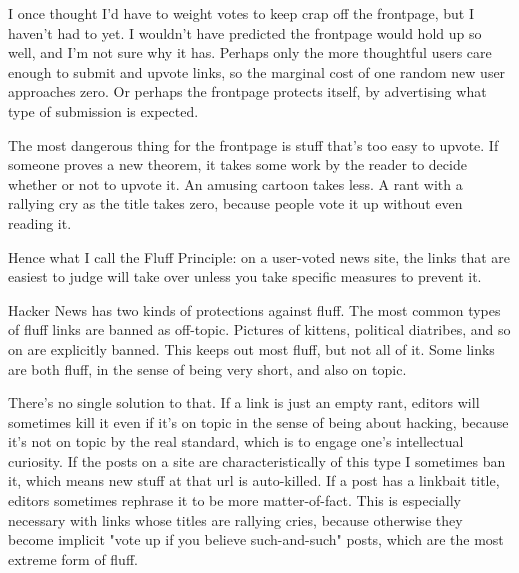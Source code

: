 I once thought I'd have
                  to weight votes to keep crap off the frontpage, but I haven't
                  had to yet. I wouldn't have predicted the frontpage would hold
                  up so well, and I'm not sure why it has. Perhaps only the more
                  thoughtful users care enough to submit and upvote links, so
                  the marginal cost of one random new user approaches zero. Or
                  perhaps the frontpage protects itself, by advertising what
                  type of submission is expected.

The most dangerous
                  thing for the frontpage is stuff that's too easy to upvote. If
                  someone proves a new theorem, it takes some work by the reader
                  to decide whether or not to upvote it. An amusing cartoon
                  takes less. A rant with a rallying cry as the title takes
                  zero, because people vote it up without even reading it.

Hence
                  what I call the Fluff Principle: on a user-voted news site,
                  the links that are easiest to judge will take over unless you
                  take specific measures to prevent it.

Hacker News
                  has two kinds of protections against fluff. The most common
                  types of fluff links are banned as off-topic. Pictures of
                  kittens, political diatribes, and so on are explicitly banned.
                  This keeps out most fluff, but not all of it. Some links are
                  both fluff, in the sense of being very short, and also on
                  topic.

There's no single solution to that. If a
                  link is just an empty rant, editors will sometimes kill it
                  even if it's on topic in the sense of being about hacking,
                  because it's not on topic by the real standard, which is to
                  engage one's intellectual curiosity. If the posts on a site
                  are characteristically of this type I sometimes ban it, which
                  means new stuff at that url is auto-killed. If a post has a
                  linkbait title, editors sometimes rephrase it to be more
                  matter-of-fact. This is especially necessary with links whose
                  titles are rallying cries, because otherwise they become
                  implicit "vote up if you believe such-and-such" posts, which
                  are the most extreme form of fluff.

